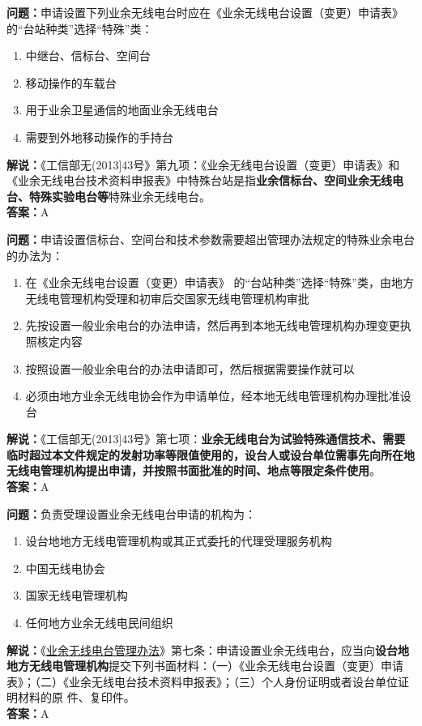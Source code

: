 \textbf{问题：}申请设置下列业余无线电台时应在《业余无线电台设置（变更）申请表》 的“台站种类”选择“特殊”类：
\begin{enumerate}[label=\Alph*), leftmargin=1.5cm]
	\item 中继台、信标台、空间台
	\item 移动操作的车载台
	\item 用于业余卫星通信的地面业余无线电台
	\item 需要到外地移动操作的手持台
\end{enumerate}
\textbf{解说：}《工信部无(2013]43号》第九项：《业余无线电台设置（变更）申请表》和《业余无线电台技术资料申报表》中特殊台站是指\textbf{业余信标台、空间业余无线电台、特殊实验电台等}特殊业余无线电台。\\\textbf{答案：}A

\textbf{问题：}申请设置信标台、空间台和技术参数需要超出管理办法规定的特殊业余电台的办法为：
\begin{enumerate}[label=\Alph*), leftmargin=1.5cm]
	\item 在《业余无线电台设置（变更）申请表》 的“台站种类”选择“特殊”类，由地方无线电管理机构受理和初审后交国家无线电管理机构审批
	\item 先按设置一般业余电台的办法申请，然后再到本地无线电管理机构办理变更执照核定内容
	\item 按照设置一般业余电台的办法申请即可，然后根据需要操作就可以
	\item 必须由地方业余无线电协会作为申请单位，经本地无线电管理机构办理批准设台
\end{enumerate}
\textbf{解说：}《工信部无(2013]43号》第七项：\textbf{业余无线电台为试验特殊通信技术、需要临时超过本文件规定的发射功率等限值使用的，设台人或设台单位需事先向所在地无线电管理机构提出申请，并按照书面批准的时间、地点等限定条件使用}。\\\textbf{答案：}A

\textbf{问题：}负责受理设置业余无线电台申请的机构为：
\begin{enumerate}[label=\Alph*), leftmargin=1.5cm]
	\item 设台地地方无线电管理机构或其正式委托的代理受理服务机构
	\item 中国无线电协会
	\item 国家无线电管理机构
	\item 任何地方业余无线电民间组织
\end{enumerate}
\textbf{解说：}《\href{https://www.miit.gov.cn/jgsj/zfs/bmgz/art/2020/art_147b69815b3641caad9047735f94c860.html}{业余无线电台管理办法}》第七条：申请设置业余无线电台，应当向\textbf{设台地地方无线电管理机构}提交下列书面材料：（一）《业余无线电台设置（变更）申请表》；（二）《业余无线电台技术资料申报表》；（三）个人身份证明或者设台单位证明材料的原
件、复印件。\\\textbf{答案：}A

